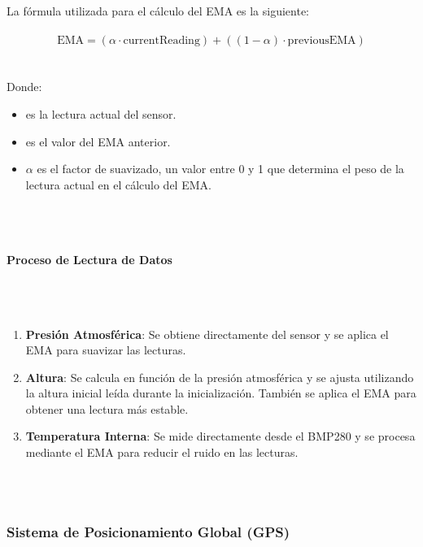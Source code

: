 La fórmula utilizada para el cálculo del EMA es la siguiente:
\\ \\
\[
\text{EMA} = (\alpha \cdot \text{currentReading}) + ((1 - \alpha) \cdot \text{previousEMA})
\]
\\ \\
Donde:
\begin{itemize}
    \item {} es la lectura actual del sensor.
    \item {} es el valor del EMA anterior.
    \item $\alpha$ es el factor de suavizado, un valor entre 0 y 1 que determina el peso de la lectura actual en el cálculo del EMA.
\end{itemize}
\\ \\
\paragraph{\large  \textbf{Proceso de Lectura de Datos}}
\\ \\
\begin{enumerate}
    \item \textbf{Presión Atmosférica}: Se obtiene directamente del sensor y se aplica el EMA para suavizar las lecturas.
    \item \textbf{Altura}: Se calcula en función de la presión atmosférica y se ajusta utilizando la altura inicial leída durante la inicialización. También se aplica el EMA para obtener una lectura más estable.
    \item \textbf{Temperatura Interna}: Se mide directamente desde el BMP280 y se procesa mediante el EMA para reducir el ruido en las lecturas.
\end{enumerate}\\ \\



\subsubsection{Sistema de Posicionamiento Global (GPS)}\\ \\


